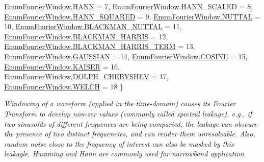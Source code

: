 \begin{DoxyCompactItemize}
\mbox{\hyperlink{namespace_c_s_i_1_1_library_1_1_math_utilities_ae198dd0fb970192351d3966c18b65f06add3c91585535e3138c32ae3bad96fd83}{Enum\+Fourier\+Window.\+H\+A\+NN}} = 7, 
\newline
\mbox{\hyperlink{namespace_c_s_i_1_1_library_1_1_math_utilities_ae198dd0fb970192351d3966c18b65f06acf35cce3992ed77a02725d9fa66a00c5}{Enum\+Fourier\+Window.\+H\+A\+N\+N\+\_\+\+S\+C\+A\+L\+ED}} = 8, 
\mbox{\hyperlink{namespace_c_s_i_1_1_library_1_1_math_utilities_ae198dd0fb970192351d3966c18b65f06a2f60fca947aac673061e7e2571954628}{Enum\+Fourier\+Window.\+H\+A\+N\+N\+\_\+\+S\+Q\+U\+A\+R\+ED}} = 9, 
\mbox{\hyperlink{namespace_c_s_i_1_1_library_1_1_math_utilities_ae198dd0fb970192351d3966c18b65f06afdc9fb4d3e50dd2d5d0b1ff8ce82df7b}{Enum\+Fourier\+Window.\+N\+U\+T\+T\+AL}} = 10, 
\mbox{\hyperlink{namespace_c_s_i_1_1_library_1_1_math_utilities_ae198dd0fb970192351d3966c18b65f06ad186098159065904bf610c9b7ee3fee9}{Enum\+Fourier\+Window.\+B\+L\+A\+C\+K\+M\+A\+N\+\_\+\+N\+U\+T\+T\+AL}} = 11, 
\newline
\mbox{\hyperlink{namespace_c_s_i_1_1_library_1_1_math_utilities_ae198dd0fb970192351d3966c18b65f06a571575ff930fc746f331e0f84155fac0}{Enum\+Fourier\+Window.\+B\+L\+A\+C\+K\+M\+A\+N\+\_\+\+H\+A\+R\+R\+IS}} = 12, 
\mbox{\hyperlink{namespace_c_s_i_1_1_library_1_1_math_utilities_ae198dd0fb970192351d3966c18b65f06a51ccd66151f68fd057c6317c3edf672f}{Enum\+Fourier\+Window.\+B\+L\+A\+C\+K\+M\+A\+N\+\_\+\+H\+A\+R\+R\+I\+S\+\_\+T\+E\+RM}} = 13, 
\mbox{\hyperlink{namespace_c_s_i_1_1_library_1_1_math_utilities_ae198dd0fb970192351d3966c18b65f06a0fceff26ae86a047835cafbb6cadb1b9}{Enum\+Fourier\+Window.\+G\+A\+U\+S\+S\+I\+AN}} = 14, 
\mbox{\hyperlink{namespace_c_s_i_1_1_library_1_1_math_utilities_ae198dd0fb970192351d3966c18b65f06ae66ba018ef96aa5c78c8fba787f43717}{Enum\+Fourier\+Window.\+C\+O\+S\+I\+NE}} = 15, 
\newline
\mbox{\hyperlink{namespace_c_s_i_1_1_library_1_1_math_utilities_ae198dd0fb970192351d3966c18b65f06a9b49d8a6d505b416c90acf00e67acc83}{Enum\+Fourier\+Window.\+K\+A\+I\+S\+ER}} = 16, 
\mbox{\hyperlink{namespace_c_s_i_1_1_library_1_1_math_utilities_ae198dd0fb970192351d3966c18b65f06a8a0dcc785f765f4c5d2459011ca79ae2}{Enum\+Fourier\+Window.\+D\+O\+L\+P\+H\+\_\+\+C\+H\+E\+B\+Y\+S\+H\+EV}} = 17, 
\mbox{\hyperlink{namespace_c_s_i_1_1_library_1_1_math_utilities_ae198dd0fb970192351d3966c18b65f06a487e01095481e7cb90ce46925f0e87e3}{Enum\+Fourier\+Window.\+W\+E\+L\+CH}} = 18
 \}
\begin{DoxyCompactList}\small\item\em Windowing of a waveform (applied in the time-\/domain) causes its Fourier Transform to develop non-\/zer values (commonly called spectral leakage), e.\+g., if two sinusoids of different frequences are being comparied, the leakage can obscure the presence of two distinct frequencies, and can render them unresolvable. Also, random noise close to the frequency of interest can also be masked by this leakagle. Hamming and Hann are commonly used for narrowband application. \end{DoxyCompactList}\end{DoxyCompactItemize}


